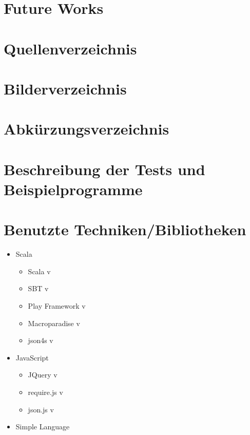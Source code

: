 \documentclass[12pt]{scrreprt}
\begin{document}
\section{Future Works}
\label{sec:future-works}

\section{Quellenverzeichnis}


\section{Bilderverzeichnis}


\section{Abkürzungsverzeichnis}

\begin{acronym}[TU-Berlin]
 \acro{}{}
\end{acronym}


\section{Beschreibung der Tests und Beispielprogramme}


\section{Benutzte Techniken/Bibliotheken}

\begin{itemize}
  \item{Scala}
  \begin{itemize}
    \item{Scala v}
    \item{SBT v}
    \item{Play Framework v}
    \item{Macroparadise v}
    \item{json4s v}
  \end{itemize}
  \item{JavaScript}
  \begin{itemize}
    \item{JQuery v}
    \item{require.js v}
    \item{json.js v}
  \end{itemize}
  \item{Simple Language}
\end{itemize}
\end{document}

